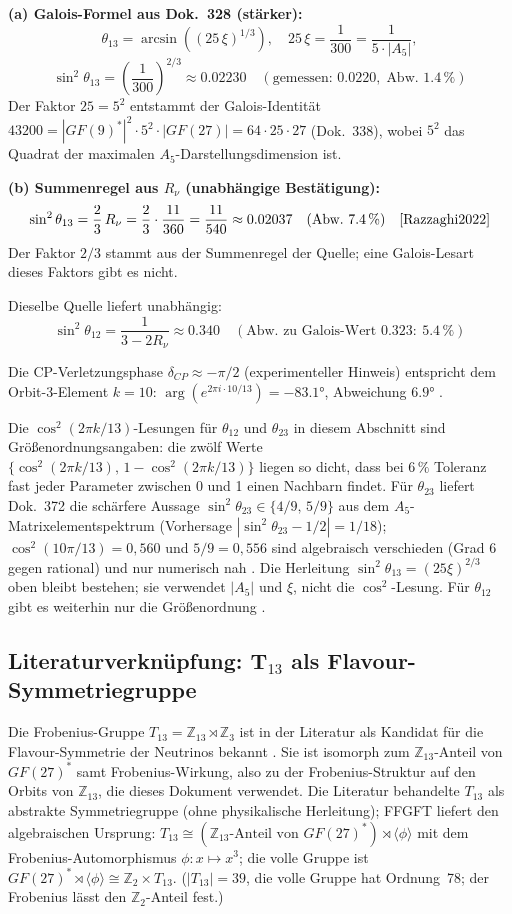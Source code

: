 \textbf{(a) Galois-Formel aus Dok.~328 (stärker):}
\[
\theta_{13}=\arcsin\!\left((25\,\xi)^{1/3}\right),\quad
25\,\xi=\frac{1}{300}=\frac{1}{5\cdot|A_5|},
\]
\[
\sin^2\theta_{13}=\left(\frac{1}{300}\right)^{2/3}\approx0.02230
\quad(\text{gemessen: }0.0220,\;\text{Abw.\ }1.4\,\%)
\]
Der Faktor $25=5^2$ entstammt der Galois-Identität
$43200=|GF(9)^*|^2\cdot5^2\cdot|GF(27)|=64\cdot25\cdot27$
(Dok.~338), wobei $5^2$ das Quadrat der maximalen $A_5$-Darstellungsdimension ist.

\textbf{(b) Summenregel aus $R_\nu$ (unabhängige Bestätigung):}
\[
\sin^2\theta_{13}=\frac{2}{3}\,R_\nu
=\frac{2}{3}\cdot\frac{11}{360}=\frac{11}{540}\approx0.02037
\quad(\text{Abw.\ }7.4\,\%)\quad\cite{Razzaghi2022}
\]
Der Faktor $2/3$ stammt aus der Summenregel der Quelle; eine Galois-Lesart
dieses Faktors gibt es nicht.

Dieselbe Quelle liefert unabhängig:
\[
\sin^2\theta_{12}=\frac{1}{3-2R_\nu}\approx0.340
\quad(\text{Abw.\ zu Galois-Wert }0.323{:}\ 5.4\,\%)
\]

Die CP-Verletzungsphase $\delta_{CP}\approx-\pi/2$ (experimenteller
Hinweis) entspricht dem Orbit-3-Element $k=10$:
$\arg(e^{2\pi i\cdot10/13})=-83.1°$, Abweichung $6.9°$ \SM.

\medskip\noindent Die
$\cos^2(2\pi k/13)$-Lesungen für $\theta_{12}$ und $\theta_{23}$ in diesem
Abschnitt sind Größenordnungsangaben: die zwölf Werte
$\{\cos^2(2\pi k/13),\,1-\cos^2(2\pi k/13)\}$ liegen so dicht, dass bei
$6\,\%$ Toleranz fast jeder Parameter zwischen 0 und 1 einen Nachbarn findet.
Für $\theta_{23}$ liefert Dok.~372 die schärfere Aussage
$\sin^2\theta_{23}\in\{4/9,\,5/9\}$ aus dem $A_5$-Matrixelementspektrum
(Vorhersage $|\sin^2\theta_{23}-1/2| = 1/18$); $\cos^2(10\pi/13) = 0{,}560$
und $5/9 = 0{,}556$ sind algebraisch verschieden (Grad 6 gegen rational) und
nur numerisch nah \BM. Die Herleitung
$\sin^2\theta_{13} = (25\xi)^{2/3}$ oben bleibt bestehen; sie verwendet
$|A_5|$ und $\xi$, nicht die $\cos^2$-Lesung. Für $\theta_{12}$ gibt es
weiterhin nur die Größenordnung \SM.

\subsection*{Literaturverknüpfung: T$_{13}$ als Flavour-Symmetriegruppe}

Die Frobenius-Gruppe $T_{13}=\mathbb{Z}_{13}\rtimes\mathbb{Z}_3$
ist in der Literatur als Kandidat für die Flavour-Symmetrie der
Neutrinos bekannt \cite{Hartmann2011}. Sie ist isomorph zum
$\mathbb{Z}_{13}$-Anteil von $GF(27)^*$ samt Frobenius-Wirkung, also zu der
Frobenius-Struktur auf den Orbits von $\mathbb{Z}_{13}$, die dieses Dokument verwendet.
Die Literatur behandelte $T_{13}$ als abstrakte Symmetriegruppe
(ohne physikalische Herleitung); FFGFT liefert den algebraischen
Ursprung: $T_{13}\cong(\mathbb{Z}_{13}\text{-Anteil von }GF(27)^*)\rtimes\langle\phi\rangle$
mit dem Frobenius-Automorphismus $\phi:x\mapsto x^3$; die volle Gruppe ist
$GF(27)^*\rtimes\langle\phi\rangle\cong\mathbb{Z}_2\times T_{13}$.
($|T_{13}|=39$, die volle Gruppe hat Ordnung~78; der Frobenius lässt den
$\mathbb{Z}_2$-Anteil fest.)

